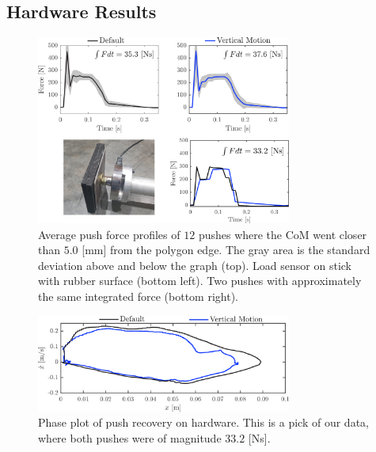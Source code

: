 \documentclass[letterpaper, 10 pt, conference]{ieeeconf}  %
\begin{document}
\subsection{Hardware Results}\label{subsec:hardware}
\begin{figure}
      \centering
      \includegraphics[width=3.3in]{impulsecompare2.png}
      \caption{Average push force profiles of $12$ pushes where the CoM went closer than $5.0$ [mm] from the polygon edge. The gray area is the standard deviation above and below the graph (top). Load sensor on stick with rubber surface (bottom left). Two pushes with approximately the same integrated force (bottom right).}
      \label{fig:impulsecompare}
\end{figure}
\begin{figure}
      \centering
      \includegraphics[width=3.3in]{valcomparephaseHW.png}
      \caption{Phase plot of push recovery on hardware. This is a pick of our data, where both pushes were of magnitude $33.2$ [Ns]. }
      \label{fig:valcomparephaseHW}
\end{figure}
\end{document}

